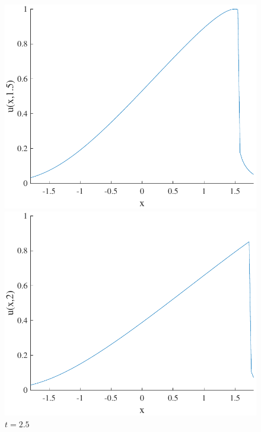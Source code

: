 \documentclass{article}
\begin{document}
\begin{figure}[H]
  \centering
  \begin{minipage}[b]{0.49\textwidth}
    \includegraphics[width=\textwidth]{hw_13_plot6.pdf}
    \caption{$t = 1.5$}

  \end{minipage}
  \hfill
  \begin{minipage}[b]{0.49\textwidth}
    \includegraphics[width=\textwidth]{hw_13_plot7.pdf}
    \caption{$t = 2.5$}

  \end{minipage}
    \hfill
\end{figure}
\end{document}
